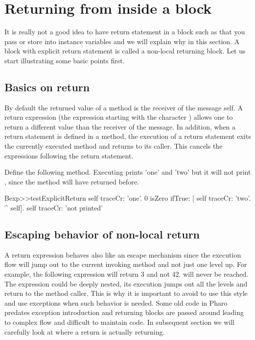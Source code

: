 \documentclass[a4paper,10pt,twoside]{book}
\begin{document}
\section{Returning from inside a block}
It is really not a good idea to have return statement in a block such as \ct{[^ 33]} that you pass or store into instance variables and we will explain why in this section. A block with explicit return statement is called a non-local returning block. Let us start illustrating some basic points first.

\subsection{Basics on return}
By default the returned value of a method is the receiver of the message \ie self.
A return expression (the expression starting with the character \ct{^}) allows one to return a different value than the receiver of the message. In addition, when a return statement is defined in a method, the execution of a return statement exits the currently executed method and returns to its caller. This cancels the expressions following the return statement.

Define the following method. Executing   prints 'one' and 'two' but it will not print , since the method  will have returned before.

\begin{code}{}
Bexp>>testExplicitReturn
	self traceCr: 'one'.
	0 isZero ifTrue: [ self traceCr: 'two'. ^ self].
	self traceCr: 'not printed'
\end{code}


%
%


\subsection{Escaping behavior of non-local return}
A return expression behaves also like an escape mechanism since the execution flow will jump out to the current invoking method and not just one level up. For example, the following expression  will return 3 and not 42.  will never be reached. The expression \ct{[ ^3 ]} could be deeply nested, its execution jumps out all the levels and return to the method caller. This is why it is important to avoid to use this style and use exceptions when such behavior is needed. Some old code in Pharo predates exception introduction and returning blocks are passed around leading to complex flow and difficult to maintain code. In subsequent section we will carefully look at where a return is actually returning.
\end{document}
